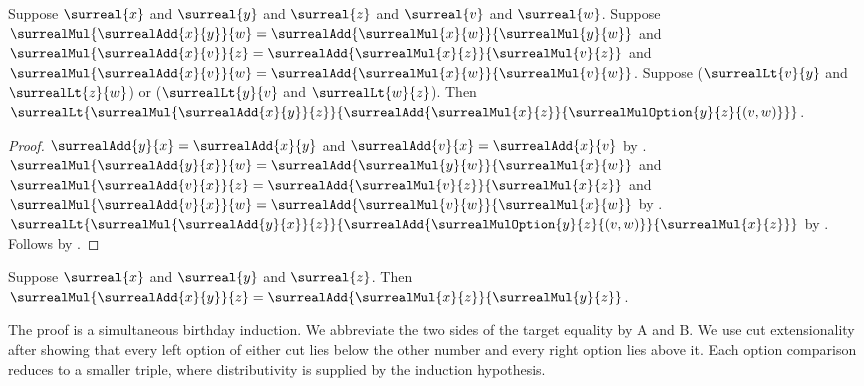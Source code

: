 \begin{lemma}\label{surreal_distributive_option_lt_mixed_right}
    Suppose $\surreal{x}$ and $\surreal{y}$ and $\surreal{z}$ and
        $\surreal{v}$ and $\surreal{w}$.
    Suppose
        $\surrealMul{\surrealAdd{x}{y}}{w}
            =\surrealAdd{\surrealMul{x}{w}}{\surrealMul{y}{w}}$ and
        $\surrealMul{\surrealAdd{x}{v}}{z}
            =\surrealAdd{\surrealMul{x}{z}}{\surrealMul{v}{z}}$ and
        $\surrealMul{\surrealAdd{x}{v}}{w}
            =\surrealAdd{\surrealMul{x}{w}}{\surrealMul{v}{w}}$.
    Suppose
        ($\surrealLt{v}{y}$ and $\surrealLt{z}{w}$) or
        ($\surrealLt{y}{v}$ and $\surrealLt{w}{z}$).
    Then
        $\surrealLt
            {\surrealMul{\surrealAdd{x}{y}}{z}}
            {\surrealAdd{\surrealMul{x}{z}}
                {\surrealMulOption{y}{z}{(v,w)}}}$.
\end{lemma}
\begin{proof}
    $\surrealAdd{y}{x}=\surrealAdd{x}{y}$ and
        $\surrealAdd{v}{x}=\surrealAdd{x}{v}$
        by .
    $\surrealMul{\surrealAdd{y}{x}}{w}
        =\surrealAdd{\surrealMul{y}{w}}{\surrealMul{x}{w}}$ and
        $\surrealMul{\surrealAdd{v}{x}}{z}
        =\surrealAdd{\surrealMul{v}{z}}{\surrealMul{x}{z}}$ and
        $\surrealMul{\surrealAdd{v}{x}}{w}
        =\surrealAdd{\surrealMul{v}{w}}{\surrealMul{x}{w}}$
        by .
    $\surrealLt
        {\surrealMul{\surrealAdd{y}{x}}{z}}
        {\surrealAdd{\surrealMulOption{y}{z}{(v,w)}}
            {\surrealMul{x}{z}}}$
        by .
    Follows by
        .
\end{proof}

\begin{theorem}\label{surreal_mul_distributive_right}
    Suppose $\surreal{x}$ and $\surreal{y}$ and $\surreal{z}$.
    Then $\surrealMul{\surrealAdd{x}{y}}{z}
        =\surrealAdd{\surrealMul{x}{z}}{\surrealMul{y}{z}}$.
\end{theorem}

The proof is a simultaneous birthday induction. We abbreviate the two
sides of the target equality by A and B. We use cut extensionality
after showing that every left option of either cut lies below the other
number and every right option lies above it. Each option comparison
reduces to a smaller triple, where distributivity is supplied by the
induction hypothesis.

